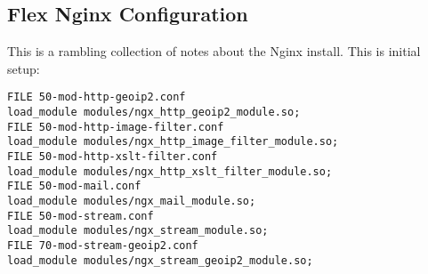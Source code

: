 \subsection{Flex Nginx Configuration}

This is a rambling collection of notes about the Nginx
install. This is initial setup:

\begingroup \fontsize{10pt}{10pt}
\selectfont
\begin{verbatim} 
FILE 50-mod-http-geoip2.conf
load_module modules/ngx_http_geoip2_module.so;
FILE 50-mod-http-image-filter.conf
load_module modules/ngx_http_image_filter_module.so;
FILE 50-mod-http-xslt-filter.conf
load_module modules/ngx_http_xslt_filter_module.so;
FILE 50-mod-mail.conf
load_module modules/ngx_mail_module.so;
FILE 50-mod-stream.conf
load_module modules/ngx_stream_module.so;
FILE 70-mod-stream-geoip2.conf
load_module modules/ngx_stream_geoip2_module.so;
\end{verbatim}
\endgroup
